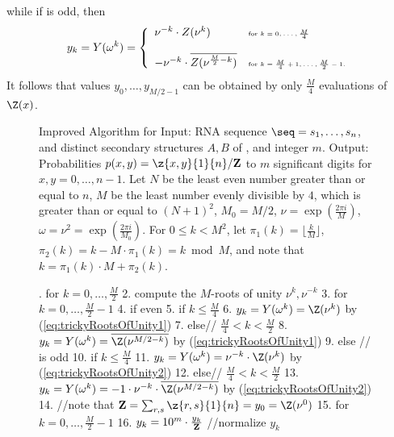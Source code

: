 while if \dBP{\strA}{\strB} is odd, then
\begin{eqnarray}
\label{eq:trickyRootsOfUnity2}
y_k = Y(\omega^k) = \left\{
\begin{array}{ll}
\nu^{-k} \cdot Z(\nu^k) &\mbox{\tiny for $k=0,\ldots,\frac{M}{4}$}\\
\quad & \quad\\
-\nu^{-k} \cdot \overline{Z(\nu^{\frac{M}{2}-k})} &\mbox{\tiny for $k=\frac{M}{4}+1,\ldots,\frac{M}{2}-1$.}\\
\end{array} \right.
\end{eqnarray}
It follows that values $y_0,\ldots,y_{M/2-1}$ can be obtained by only
$\frac{M}{4}$ evaluations of $\Z(x)$.


\begin{figure}[!ht]
\begin{small}
{\sc Improved Algorithm} for \ffttwo\hfill\break
{\sc Input:} RNA sequence $\seq=s_1,\ldots,s_n$, and distinct secondary
structures $A,B$ of \seq, and integer $m$. \hfill\break
{\sc Output:} Probabilities $p(x,y)=\z{x,y}{1}{n}/{\bf Z}$
to $m$ significant digits for $x,y=0,\ldots,n-1$.
Let $N$ be the least even number greater than or equal
to $n$, $M$ be the least number evenly divisible by $4$, which is greater than
or equal to $(N+1)^2$, $M_0=M/2$, $\nu = \exp(\frac{2\pi i}{M})$,
$\omega=\nu^2= \exp(\frac{2\pi i}{M_0})$. For $0 \leq k < M^2$, let
$\pi_1(k) = \lfloor \frac{k}{M} \rfloor$,
$\pi_2(k) = k - M \cdot \pi_1(k) = k \bmod M$, and note that
$k=\pi_1(k)\cdot M + \pi_2(k)$.
\end{small}
\hfill\break
\smallskip
\begin{small}
.  for $k=0,\ldots,\frac{M}{2}$
2.    compute the $M$-roots of unity $\nu^k,\nu^{-k}$
3.  for $k=0,\ldots,\frac{M}{2}-1$
4.    if \dBP{\strA}{\strB} even
5.      if $k \leq \frac{M}{4}$
6.        $y_k = Y(\omega^k)=\Z(\nu^k)$ by (\ref{eq:trickyRootsOfUnity1})
7.      else// $\frac{M}{4}<k<\frac{M}{2}$
8.        $y_k = Y(\omega^k)=\overline{\Z(\nu^{M/2-k})}$ by (\ref{eq:trickyRootsOfUnity1})
9.    else // \dBP{\strA}{\strB} is odd
10.     if $k \leq \frac{M}{4}$
11.       $y_k = Y(\omega^k)=\nu^{-k} \cdot \Z(\nu^k)$ by (\ref{eq:trickyRootsOfUnity2})
12.     else// $\frac{M}{4}<k<\frac{M}{2}$
13.       $y_k = Y(\omega^k)= -1 \cdot \nu^{-k} \cdot \overline{\Z(\nu^{M/2-k})}$ by (\ref{eq:trickyRootsOfUnity2})
14. //note that ${\bf Z}=\sum_{r,s}\z{r,s}{1}{n}=y_0=\Z(\nu^0)$
15. for $k=0,\ldots,\frac{M}{2}-1$
16.   $y_k = 10^m \cdot \frac{y_k}{{\bf Z}}$ //normalize $y_k$



\end{small}
\end{figure}
